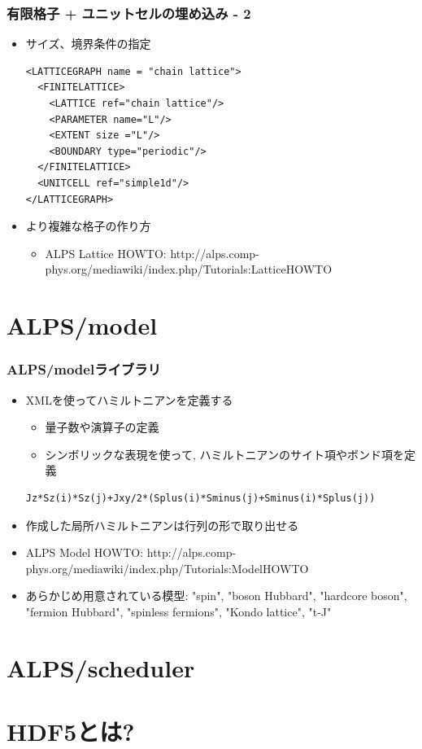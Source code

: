 \begin{frame}[t,fragile]
  \frametitle{有限格子 + ユニットセルの埋め込み - 2}
  \begin{itemize}
  \item サイズ、境界条件の指定
    \begin{lstlisting}
<LATTICEGRAPH name = "chain lattice">
  <FINITELATTICE>
    <LATTICE ref="chain lattice"/>
    <PARAMETER name="L"/>
    <EXTENT size ="L"/>
    <BOUNDARY type="periodic"/>
  </FINITELATTICE>
  <UNITCELL ref="simple1d"/>
</LATTICEGRAPH>
    \end{lstlisting}
  \item より複雑な格子の作り方
    \begin{itemize}
    \item ALPS Lattice HOWTO: http://alps.comp-phys.org/mediawiki/index.php/Tutorials:LatticeHOWTO
    \end{itemize}
  \end{itemize}
\end{frame}

\section{ALPS/model}

\begin{frame}[t,fragile]
  \frametitle{ALPS/modelライブラリ}
  \begin{itemize}
  \item XMLを使ってハミルトニアンを定義する
    \begin{itemize}  
    \item 量子数や演算子の定義
    \item シンボリックな表現を使って, ハミルトニアンのサイト項やボンド項を定義
    \end{itemize}
    \begin{lstlisting}
Jz*Sz(i)*Sz(j)+Jxy/2*(Splus(i)*Sminus(j)+Sminus(i)*Splus(j))
    \end{lstlisting}
  \item 作成した局所ハミルトニアンは行列の形で取り出せる
  \item ALPS Model HOWTO: http://alps.comp-phys.org/mediawiki/index.php/Tutorials:ModelHOWTO
  \item あらかじめ用意されている模型: "spin", "boson Hubbard", "hardcore boson", "fermion Hubbard", "spinless fermions", "Kondo lattice", "t-J"
  \end{itemize}
\end{frame}

\section{ALPS/scheduler}
\section{HDF5とは?}


